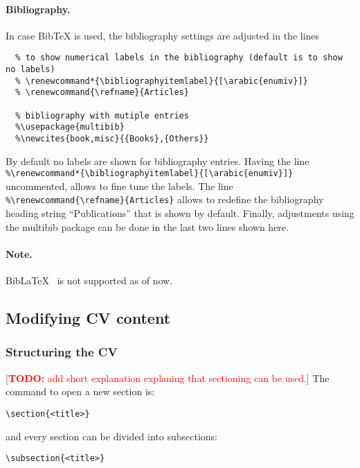 \documentclass[a4paper,11pt]{article}
\newcommand{\todox}[1]{\textcolor{red}{[\textbf{TODO:} #1]}}
\newcommand{\biblatex}{BibLaTeX}
\begin{document}
\paragraph{Bibliography.}
In case BibTeX is used, the bibliography settings are adjusted in the lines 
\begin{lstlisting}
  % to show numerical labels in the bibliography (default is to show no labels)
  % \renewcommand*{\bibliographyitemlabel}{[\arabic{enumiv}]}
  % \renewcommand{\refname}{Articles}

  % bibliography with mutiple entries
  %\usepackage{multibib}
  %\newcites{book,misc}{{Books},{Others}}
\end{lstlisting}
By default no labels are shown for bibliography entries. 
Having the line 
\lstinline!%\renewcommand*{\bibliographyitemlabel}{[\arabic{enumiv}]}! uncommented, 
allows to fine tune the labels. 
The line \lstinline!%\renewcommand{\refname}{Articles}! allows to redefine the bibliography heading string ``Publications'' that is shown by default. 
Finally, adjustments using the multibib package can be done in the last two lines shown here. 

\paragraph{Note.} \biblatex~ is not supported as of now.

\subsection{Modifying CV content}
\subsubsection{Structuring the CV}
\todox{add short explanation explaning that sectioning can be used.}
The command to open a new section is: 

\begin{verbatim}
\section{<title>}
\end{verbatim}

and every section can be divided into subsections:

\begin{verbatim}
\subsection{<title>}
\end{verbatim}
\end{document}
